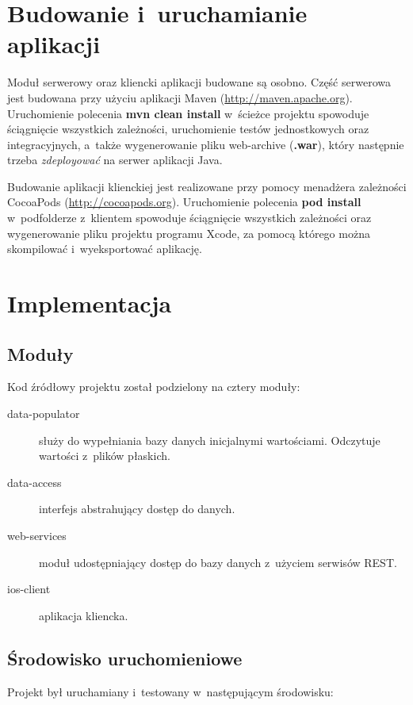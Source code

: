 \documentclass[a4paper,12pt]{article}
\begin{document}
	\section*{Budowanie i~uruchamianie aplikacji}

	Moduł serwerowy oraz kliencki aplikacji budowane są osobno. Część serwerowa jest budowana przy użyciu aplikacji Maven (\url{http://maven.apache.org}). Uruchomienie polecenia \textbf{mvn clean install} w~ścieżce projektu spowoduje ściągnięcie wszystkich zależności, uruchomienie testów jednostkowych oraz integracyjnych, a~także wygenerowanie pliku web-archive (\textbf{.war}), który następnie trzeba \emph{zdeployować} na serwer aplikacji Java.

	Budowanie aplikacji klienckiej jest realizowane przy pomocy menadżera zależności CocoaPods (\url{http://cocoapods.org}). Uruchomienie polecenia \textbf{pod install} w~podfolderze z~klientem spowoduje ściągnięcie wszystkich zależności oraz wygenerowanie pliku projektu programu Xcode, za pomocą którego można skompilować i~wyeksportować aplikację.

	\section*{Implementacja}

	\subsection*{Moduły}

	Kod źródłowy projektu został podzielony na cztery moduły:

	\begin{description}
		\item[data-populator] służy do wypełniania bazy danych inicjalnymi wartościami. Odczytuje wartości z~plików płaskich.
		\item[data-access] interfejs abstrahujący dostęp do danych.
		\item[web-services] moduł udostępniający dostęp do bazy danych z~użyciem serwisów REST.
		\item[ios-client] aplikacja kliencka.
	\end{description}

	\subsection*{Środowisko uruchomieniowe}

	Projekt był uruchamiany i~testowany w~następującym środowisku:
\end{document}
